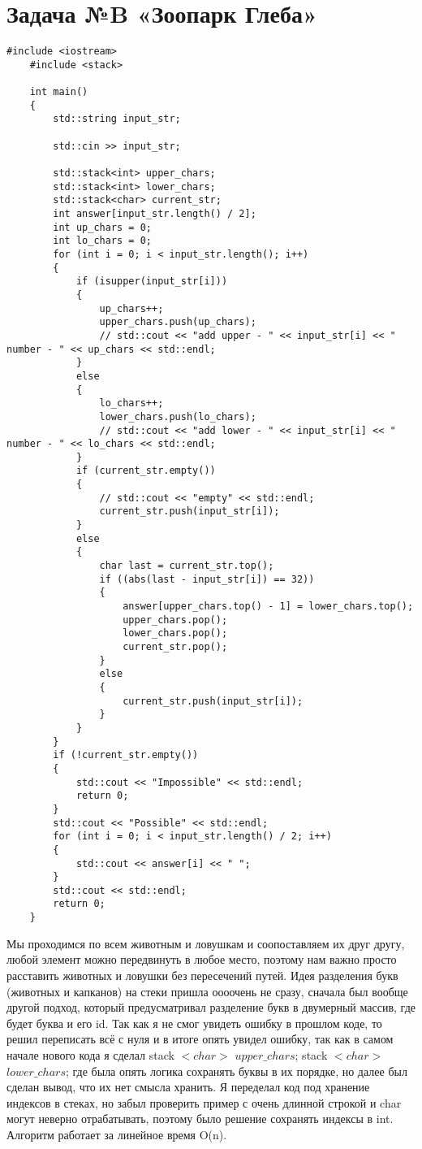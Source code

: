 \documentclass{article}
\begin{document}
\section{Задача №B «Зоопарк Глеба»}
\begin{lstlisting}[frame=single, basicstyle=\ttfamily, breaklines=true, breakatwhitespace=true, postbreak=\mbox{\textcolor{red}{$\hookrightarrow$}\space}]
    #include <iostream>
    #include <stack>
    
    int main()
    {
        std::string input_str;
    
        std::cin >> input_str;
    
        std::stack<int> upper_chars;
        std::stack<int> lower_chars;
        std::stack<char> current_str;
        int answer[input_str.length() / 2];
        int up_chars = 0;
        int lo_chars = 0;
        for (int i = 0; i < input_str.length(); i++)
        {
            if (isupper(input_str[i]))
            {
                up_chars++;
                upper_chars.push(up_chars);
                // std::cout << "add upper - " << input_str[i] << " number - " << up_chars << std::endl;
            }
            else
            {
                lo_chars++;
                lower_chars.push(lo_chars);
                // std::cout << "add lower - " << input_str[i] << " number - " << lo_chars << std::endl;
            }
            if (current_str.empty())
            {
                // std::cout << "empty" << std::endl;
                current_str.push(input_str[i]);
            }
            else
            {
                char last = current_str.top();
                if ((abs(last - input_str[i]) == 32))
                {
                    answer[upper_chars.top() - 1] = lower_chars.top();
                    upper_chars.pop();
                    lower_chars.pop();
                    current_str.pop();
                }
                else
                {
                    current_str.push(input_str[i]);
                }
            }
        }
        if (!current_str.empty())
        {
            std::cout << "Impossible" << std::endl;
            return 0;
        }
        std::cout << "Possible" << std::endl;
        for (int i = 0; i < input_str.length() / 2; i++)
        {
            std::cout << answer[i] << " ";
        }
        std::cout << std::endl;
        return 0;
    }
\end{lstlisting}
Мы проходимся по всем животным и ловушкам и соопоставляем их друг другу, любой элемент можно передвинуть в любое место, поэтому нам важно просто расставить животных и ловушки без пересечений путей.
Идея разделения букв (животных и капканов) на стеки пришла оооочень не сразу, сначала был вообще другой подход, который предусматривал разделение букв в двумерный массив, где будет буква и его id.
Так как я не смог увидеть ошибку в прошлом коде, то решил переписать всё с нуля и в итоге опять увидел ошибку, так как в самом начале нового кода я сделал stack $< char >$ $upper\_chars$;
stack $< char >$ $lower\_chars$; где была опять логика сохранять буквы в их порядке, но далее был сделан вывод, что их нет смысла хранить. Я переделал код под хранение индексов в стеках, но забыл проверить пример с очень длинной строкой и char могут неверно отрабатывать, поэтому было решение сохранять индексы в int.
Алгоритм работает за линейное время O(n).
\end{document}
